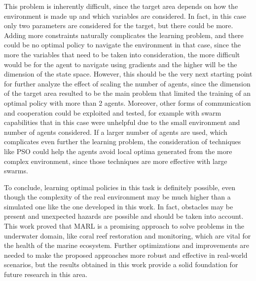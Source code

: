 This problem is inherently difficult, since the target area depends on how the environment is made up and which variables
are considered. In fact, in this case only two parameters are considered for the target, but there could be more. Adding more 
constraints naturally complicates the learning problem, and there could be no optimal policy to navigate the environment in that case,
since the more the variables that need to be taken into consideration, the more difficult would be for the agent to navigate using gradients
and the higher will be the dimension of the state space. However, this should be the very next starting point for further analyze the effect 
of scaling the number of agents, since the dimension of the target area resulted to be the main problem that limited the 
training of an optimal policy with more than 2 agents. Moreover, 
other forms of communication and cooperation could be exploited and tested, for example with swarm capabilities that in this case were unhelpful due to the 
small environment and number of agents considered. If a larger number of agents are used, which complicates even further the learning 
problem, the consideration of techniques like PSO could help the agents avoid local optima generated from the more complex environment,
since those techniques are more effective with large swarms. 

To conclude, learning optimal policies in this task is definitely possible, even though the complexity of the real environment 
may be much higher than a simulated one like the one developed in this work. In fact, obstacles may be present and unexpected hazards
are possible and should be taken into account. This work proved that MARL is a promising approach to solve problems in the underwater domain,
like coral reef restoration and monitoring, which are vital for the health of the marine ecosystem. Further optimizations and improvements are needed 
to make the proposed approaches more robust and effective in real-world scenarios, but the results obtained in this work provide a solid foundation for future research in this area.